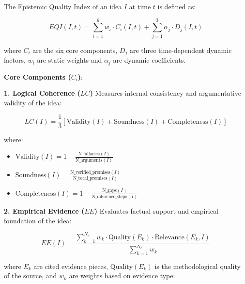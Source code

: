 \begin{definition}
	\label{def:eqi}
	The Epistemic Quality Index of an idea $I$ at time $t$ is defined as:
	
	\begin{equation}
		EQI(I,t) = \sum_{i=1}^{6} w_i \cdot C_i(I,t) + \sum_{j=1}^{3} \alpha_j \cdot D_j(I,t)
		\label{eq:eqi-general}
	\end{equation}
	
	where $C_i$ are the six core components, $D_j$ are three time-dependent dynamic factors, $w_i$ are static weights and $\alpha_j$ are dynamic coefficients.
\end{definition}

\textbf{Core Components ($C_i$)}:

\textbf{1. Logical Coherence ($LC$)}
Measures internal consistency and argumentative validity of the idea:

\begin{equation}
	LC(I) = \frac{1}{3}\left[\text{Validity}(I) + \text{Soundness}(I) + \text{Completeness}(I)\right]
	\label{eq:logical-coherence}
\end{equation}

where:
\begin{itemize}
	\item $\text{Validity}(I) = 1 - \frac{\text{N\_fallacies}(I)}{\text{N\_arguments}(I)}$
	\item $\text{Soundness}(I) = \frac{\text{N\_verified\_premises}(I)}{\text{N\_total\_premises}(I)}$
	\item $\text{Completeness}(I) = 1 - \frac{\text{N\_gaps}(I)}{\text{N\_inference\_steps}(I)}$
\end{itemize}

\textbf{2. Empirical Evidence ($EE$)}
Evaluates factual support and empirical foundation of the idea:

\begin{equation}
	EE(I) = \frac{\sum_{k=1}^{N_e} w_k \cdot \text{Quality}(E_k) \cdot \text{Relevance}(E_k, I)}{\sum_{k=1}^{N_e} w_k}
	\label{eq:empirical-evidence}
\end{equation}

where $E_k$ are cited evidence pieces, $\text{Quality}(E_k)$ is the methodological quality of the source, and $w_k$ are weights based on evidence type:

